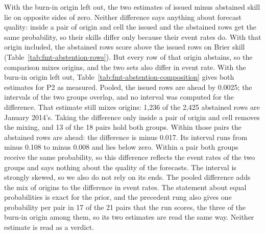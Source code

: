 With the burn-in origin left out, the two estimates of issued minus abstained skill lie on opposite sides of zero. Neither difference says anything about forecast quality: inside a pair of origin and cell the issued and the abstained rows get the same probability, so their skills differ only because their event rates do. With that origin included, the abstained rows score above the issued rows on Brier skill (Table~\ref{tab:fmt-abstention-rows}). But every row of that origin abstains, so the comparison mixes origins, and the two sets also differ in event rate. With the burn-in origin left out, Table~\ref{tab:fmt-abstention-composition} gives both estimates for P2 as measured. Pooled, the issued rows are ahead by 0.0025; the intervals of the two groups overlap, and no interval was computed for the difference. That estimate still mixes origins: 1,236 of the 2,425 abstained rows are January 2014's. Taking the difference only inside a pair of origin and cell removes the mixing, and 13 of the 18 pairs hold both groups. Within those pairs the abstained rows are ahead: the difference is minus 0.017. Its interval runs from minus 0.108 to minus 0.008 and lies below zero. Within a pair both groups receive the same probability, so this difference reflects the event rates of the two groups and says nothing about the quality of the forecasts. The interval is strongly skewed, so we also do not rely on its ends. The pooled difference adds the mix of origins to the difference in event rates. The statement about equal probabilities is exact for the prior, and the precedent rung also gives one probability per pair in 17 of the 21 pairs that the run scores, the three of the burn-in origin among them, so its two estimates are read the same way. Neither estimate is read as a verdict.

